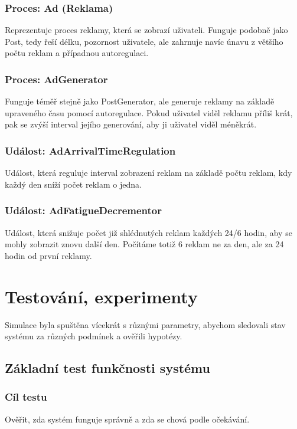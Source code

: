 \documentclass[11pt, a4paper]{article}
\begin{document}
\subsubsection{Proces: Ad (Reklama)}
Reprezentuje proces reklamy, která se zobrazí uživateli. Funguje podobně jako Post, tedy řeší délku, pozornost uživatele, ale zahrnuje navíc únavu z většího počtu reklam a případnou autoregulaci.
\subsubsection{Proces: AdGenerator}
Funguje téměř stejně jako PostGenerator, ale generuje reklamy na základě upraveného času pomocí autoregulace. Pokud uživatel viděl reklamu příliš krát, pak se zvýší interval jejího generování, aby ji uživatel viděl méněkrát.
\subsubsection{Událost: AdArrivalTimeRegulation}
Událost, která reguluje interval zobrazení reklam na základě počtu reklam, kdy každý den sníží počet reklam o jedna.
\subsubsection{Událost: AdFatigueDecrementor}
Událost, která snižuje počet již shlédnutých reklam každých 24/6 hodin, aby se mohly zobrazit znovu další den. Počítáme totiž 6 reklam ne za den, ale za 24 hodin od první reklamy.

\section{Testování, experimenty}
Simulace byla spuštěna vícekrát s různými parametry, abychom sledovali stav systému za různých podmínek a ověřili hypotézy.

\subsection{Základní test funkčnosti systému} \label{test-basic}

\subsubsection{Cíl testu}
Ověřit, zda systém funguje správně a zda se chová podle očekávání.
\end{document}
